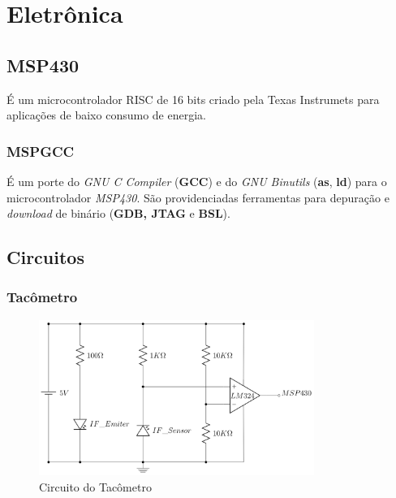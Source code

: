 \chapter{Eletrônica}
\label{eletronica}

\section{MSP430} %
\label{sec:msp430}

É um microcontrolador RISC de 16 bits criado pela Texas Instrumets para aplicações de baixo consumo de energia.



\subsection{MSPGCC} %
\label{sub:mspgcc}

É um porte do \textit{GNU C Compiler} (\textbf{GCC}) e do \textit{GNU Binutils} (\textbf{as}, \textbf{ld}) para o microcontrolador \textit{MSP430}. São providenciadas ferramentas para depuração e \textit{download} de binário (\textbf{GDB, JTAG} e \textbf{BSL}).


\section{Circuitos} %
\label{sec:circuito}

\subsection{Tacômetro} %
\label{sub:tac_metro}

\begin{figure}[h]
  \centering
	\includegraphics[width=0.8\textwidth]{figuras/tacometro}
  \caption{Circuito do Tacômetro}
  \label{fig:figuras_tacometro}
\end{figure}

